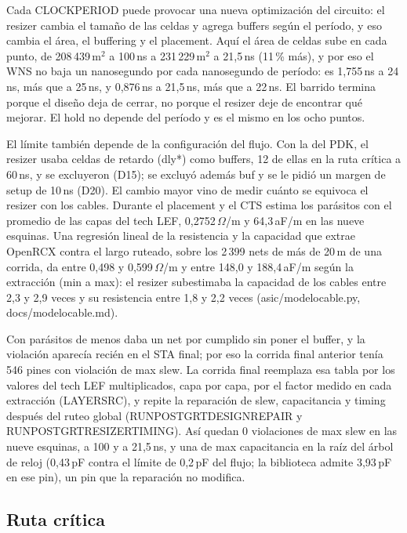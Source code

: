 \documentclass[11pt,a4paper]{article}
\DeclareRobustCommand{\sig}[1]{{\ttfamily\def\_{\textunderscore\allowbreak}#1}}
\newcommand{\um}{\,\textmu m\xspace}
\newcommand{\umd}{\,\textmu m$^2$\xspace}
\begin{document}
Cada \sig{CLOCK\_PERIOD} puede provocar una nueva optimización del circuito: el resizer cambia el tamaño de las celdas y agrega buffers según el período, y eso cambia el área, el buffering y el placement. Aquí el área de celdas sube en cada punto, de 208\,439\umd a 100\,ns a 231\,229\umd a 21,5\,ns (11\,\% más), y por eso el WNS no baja un nanosegundo por cada nanosegundo de período: es 1,755\,ns a 24\,ns, más que a 25\,ns, y 0,876\,ns a 21,5\,ns, más que a 22\,ns. El barrido termina porque el diseño deja de cerrar, no porque el resizer deje de encontrar qué mejorar. El hold no depende del período y es el mismo en los ocho puntos.

El límite también depende de la configuración del flujo. Con la del PDK, el resizer usaba celdas de retardo (\sig{dly*}) como buffers, 12 de ellas en la ruta crítica a 60\,ns, y se excluyeron (D15); se excluyó además \sig{buf\_1} y se le pidió un margen de setup de 10\,ns (D20). El cambio mayor vino de medir cuánto se equivoca el resizer con los cables. Durante el placement y el CTS estima los parásitos con el promedio de las capas del tech LEF, 0,2752\,$\Omega$/\textmu m y 64,3\,aF/\textmu m en las nueve esquinas. Una regresión lineal de la resistencia y la capacidad que extrae OpenRCX contra el largo ruteado, sobre los 2\,399 nets de más de 20\um de una corrida, da entre 0,498 y 0,599\,$\Omega$/\textmu m y entre 148,0 y 188,4\,aF/\textmu m según la extracción (min a max): el resizer subestimaba la capacidad de los cables entre 2,3 y 2,9 veces y su resistencia entre 1,8 y 2,2 veces (\sig{asic/modelo\_cable.py}, \sig{docs/modelo\_cable.md}).

Con parásitos de menos daba un net por cumplido sin poner el buffer, y la violación aparecía recién en el STA final; por eso la corrida final anterior tenía 546 pines con violación de max slew. La corrida final reemplaza esa tabla por los valores del tech LEF multiplicados, capa por capa, por el factor medido en cada extracción (\sig{LAYERS\_RC}), y repite la reparación de slew, capacitancia y timing después del ruteo global (\sig{RUN\_POST\_GRT\_DESIGN\_REPAIR} y \sig{RUN\_POST\_GRT\_RESIZER\_TIMING}). Así quedan 0 violaciones de max slew en las nueve esquinas, a 100 y a 21,5\,ns, y una de max capacitancia en la raíz del árbol de reloj (0,43\,pF contra el límite de 0,2\,pF del flujo; la biblioteca admite 3,93\,pF en ese pin), un pin que la reparación no modifica.

\subsection{Ruta crítica}
\label{sec:ruta}
\end{document}
